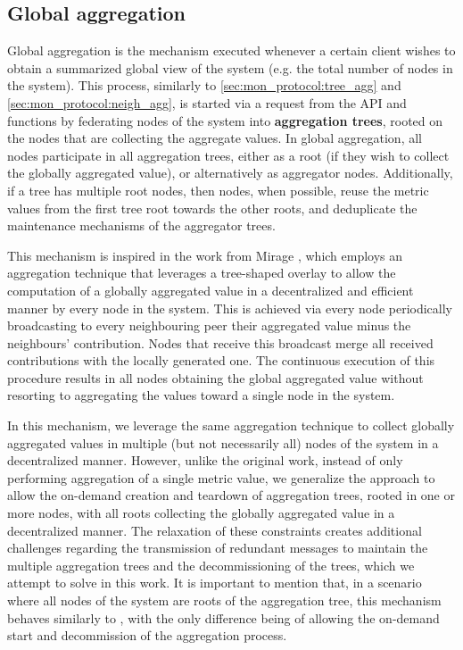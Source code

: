 \subsection{Global aggregation} \label{sec:mon_protocol:global_agg}

Global aggregation is the mechanism executed whenever a certain client wishes to obtain a summarized global view of the system (e.g. the total number of nodes in the system). This process, similarly to \ref{sec:mon_protocol:tree_agg} and \ref{sec:mon_protocol:neigh_agg}, is started via a request from the API and functions by federating nodes of the system into \textbf{aggregation trees}, rooted on the nodes that are collecting the aggregate values. In global aggregation, all nodes participate in all aggregation trees, either as a root (if they wish to collect the globally aggregated value), or alternatively as aggregator nodes. Additionally, if a tree has multiple root nodes, then nodes, when possible, reuse the metric values from the first tree root towards the other roots, and deduplicate the maintenance mechanisms of the aggregator trees. 

This mechanism is inspired in the work from Mirage \cite{akosThesis}, which employs an aggregation technique that leverages a tree-shaped overlay to allow the computation of a globally aggregated value in a decentralized and efficient manner by every node in the system. This is achieved via every node periodically broadcasting to every neighbouring peer their aggregated value minus the neighbours' contribution. Nodes that receive this broadcast merge all received contributions with the locally generated one. The continuous execution of this procedure results in all nodes obtaining the global aggregated value without resorting to aggregating the values toward a single node in the system.


In this mechanism, we leverage the same aggregation technique to collect globally aggregated values in multiple (but not necessarily all) nodes of the system in a decentralized manner. However, unlike the original work, instead of only performing aggregation of a single metric value, we generalize the approach to allow the on-demand creation and teardown of aggregation trees, rooted in one or more nodes, with all roots collecting the globally aggregated value in a decentralized manner. The relaxation of these constraints creates additional challenges regarding the transmission of redundant messages to maintain the multiple aggregation trees and the decommissioning of the trees, which we attempt to solve in this work. It is important to mention that, in a scenario where all nodes of the system are roots of the aggregation tree, this mechanism behaves similarly to \cite{akosThesis}, with the only difference being of allowing the on-demand start and decommission of the aggregation process.

